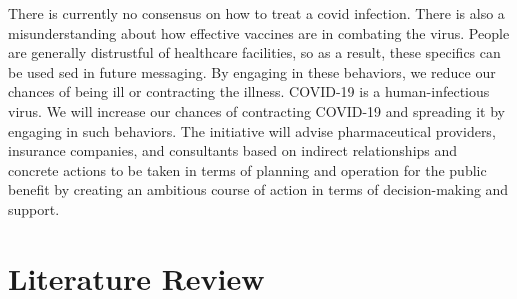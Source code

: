 \documentclass[conference]{IEEEtran}
\begin{document}
There is currently no consensus on how to treat a covid infection. There is also a misunderstanding about how effective vaccines are in combating the virus. People are generally distrustful of healthcare facilities, so as a result, these specifics can be used sed in future messaging. By engaging in these behaviors, we reduce our chances of being ill or contracting the illness. COVID-19 is a human-infectious virus. We will increase our chances of contracting COVID-19 and spreading it by engaging in such behaviors. The initiative will advise pharmaceutical providers, insurance companies, and consultants based on indirect relationships and concrete actions to be taken in terms of planning and operation for the public benefit by creating an ambitious course of action in terms of decision-making and support.





\section{Literature Review}
\end{document}
